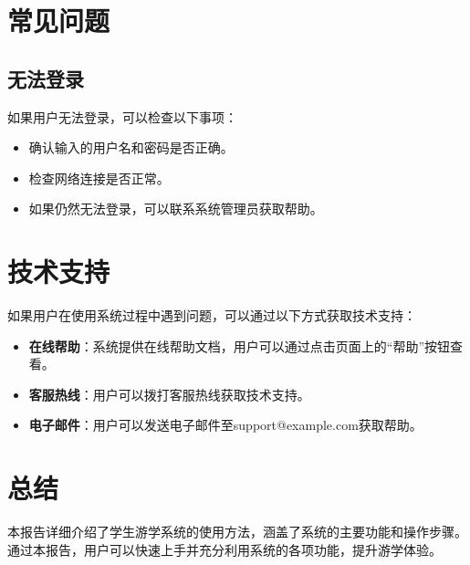 \documentclass{ctexart}
\begin{document}
\section{常见问题}

\subsection{无法登录}
如果用户无法登录，可以检查以下事项：
\begin{itemize}
    \item 确认输入的用户名和密码是否正确。
    \item 检查网络连接是否正常。
    \item 如果仍然无法登录，可以联系系统管理员获取帮助。
\end{itemize}

\section{技术支持}
如果用户在使用系统过程中遇到问题，可以通过以下方式获取技术支持：
\begin{itemize}
    \item \textbf{在线帮助}：系统提供在线帮助文档，用户可以通过点击页面上的“帮助”按钮查看。
    \item \textbf{客服热线}：用户可以拨打客服热线获取技术支持。
    \item \textbf{电子邮件}：用户可以发送电子邮件至support@example.com获取帮助。
\end{itemize}

\section{总结}
本报告详细介绍了学生游学系统的使用方法，涵盖了系统的主要功能和操作步骤。通过本报告，用户可以快速上手并充分利用系统的各项功能，提升游学体验。
\end{document}
